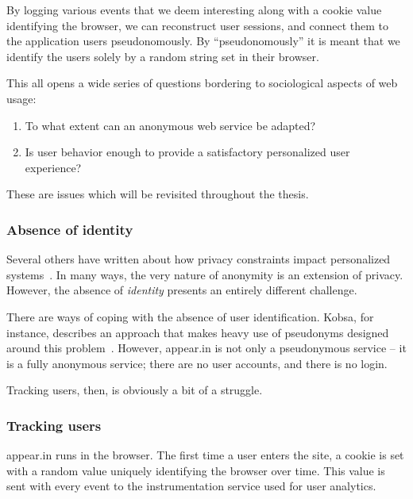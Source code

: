 By logging various events that we deem interesting along with a cookie value identifying the browser, we can reconstruct user sessions, and connect them to the application users pseudonomously. By ``pseudonomously'' it is meant that we identify the users solely by a random string set in their browser.

This all opens a wide series of questions bordering to sociological aspects of web usage:

\begin{enumerate}
  \item
    To what extent can an anonymous web service be adapted?
  \item
    Is user behavior enough to provide a satisfactory personalized user experience?
\end{enumerate}

These are issues which will be revisited throughout the thesis.

\subsubsection{Absence of identity} %

Several others have written about how privacy constraints impact personalized systems~\cite{Teltzrow2004,Kobsa2007}. In many ways, the very nature of anonymity is an extension of privacy. However, the absence of \emph{identity} presents an entirely different challenge.

There are ways of coping with the absence of user identification. Kobsa, for instance, describes an approach that makes heavy use of pseudonyms designed around this problem~\cite{Kobsa2003}.
However, appear.in is not only a pseudonymous service -- it is a fully anonymous service; there are no user accounts, and there is no login.

Tracking users, then, is obviously a bit of a struggle.

\subsubsection{Tracking users}

appear.in runs in the browser. The first time a user enters the site, a cookie is set with a random value uniquely identifying the browser over time. This value is sent with every event to the instrumentation service used for user analytics.

